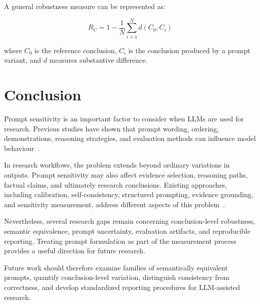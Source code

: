 \documentclass[acmsmall,screen,review]{acmart}
\begin{document}
A general robustness measure can be represented as:

\begin{equation}
R_C=1-\frac{1}{N}\sum_{i=1}^{N}d(C_0,C_i)
\label{eq:robustness}
\end{equation}

where $C_0$ is the reference conclusion, $C_i$ is the conclusion produced by a prompt variant, and $d$ measures substantive difference.

\section{Conclusion}
\label{sec:conclusion}

Prompt sensitivity is an important factor to consider when LLMs are used for research. Previous studies have shown that prompt wording, ordering, demonstrations, reasoning strategies, and evaluation methods can influence model behaviour~\cite{lu2022,zhuo2024,errica2025}.

In research workflows, the problem extends beyond ordinary variations in outputs. Prompt sensitivity may also affect evidence selection, reasoning paths, factual claims, and ultimately research conclusions. Existing approaches, including calibration, self-consistency, structured prompting, evidence grounding, and sensitivity measurement, address different aspects of this problem~\cite{zhao2021,wang2023,schulhoff2024}.

Nevertheless, several research gaps remain concerning conclusion-level robustness, semantic equivalence, prompt uncertainty, evaluation artifacts, and reproducible reporting. Treating prompt formulation as part of the measurement process provides a useful direction for future research.

Future work should therefore examine families of semantically equivalent prompts, quantify conclusion-level variation, distinguish consistency from correctness, and develop standardized reporting procedures for LLM-assisted research.



\end{document}
